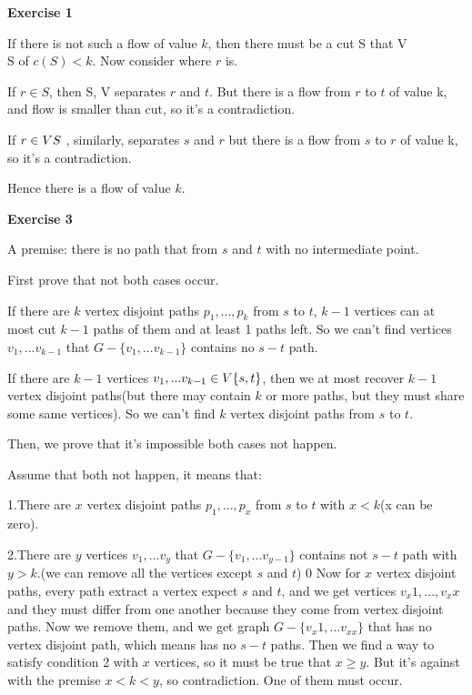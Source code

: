 \documentclass{article}
\title{Homework #5}
\author{Coffee Automaton}
\date{October 2019}
\begin{document}
\maketitle

\textbf{Exercise 1}

If there is not such a flow of value $k$, then there must be a cut S that V\\S of $c(S) < k$. Now consider where $r$ is.

If $r \in S$, then S, V separates $r$ and $t$. But there is a flow from $r$ to $t$ of value k, and flow is smaller than cut, so it's a contradiction.

If $r \in V\\S$ , similarly, separates $s$ and $r$ but there is a flow from $s$ to $r$ of value k, so it's a contradiction.

Hence there is a flow of value $k$.



\textbf{Exercise 3}

A premise: there is no path that from $s$ and $t$ with no intermediate point.

First prove that not both cases occur.

If there are $k$ vertex disjoint paths $p_1 , ...,  p_k$ from $s$ to $t$, $k-1$ vertices can at most cut $k-1$ paths of them and at least 1 paths left. So we can't find vertices $v_1, ...v_{k-1}$ that $G - \{v_1, ...v_{k-1}\}$ contains no $s-t$ path.

If there are $k-1$ vertices $v_1, ...v_{k-1} \in V \\ \{ s,t \}$, then we at most recover $k-1$ vertex disjoint paths(but there may contain $k$ or more paths, but they must share some same vertices). So we can't find $k$ vertex disjoint paths from $s$ to $t$.

Then, we prove that it's impossible both cases not happen.

Assume that both not happen, it means that:

1.There are $x$ vertex disjoint paths $p_1, ... , p_x$ from $s$ to $t$ with $x < k$(x can be zero).

2.There are $y$ vertices $v_1,... v_y$ that $G - \{v_1, ...v_{y-1}\}$ contains not $s-t$ path with $y > k$.(we can remove all the vertices except $s$ and $t$)
0
Now for $x$ vertex disjoint paths, every path extract a vertex expect $s$ and $t$, and we get vertices $v_x1, ... , v_xx$ and they must differ from one another because they come from vertex disjoint paths. Now we remove them, and we get graph $G - \{v_x1, ...v_{xx}\}$ that has no vertex disjoint path, which means has no $s-t$ paths. Then we find a way to satisfy condition 2 with $x$ vertices, so it must be true that $x \geqslant y$. But it's against with the premise $x < k < y$, so contradiction. One of them must occur.
\end{document}
